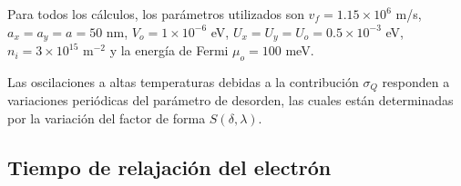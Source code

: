 \begin{frame}
  Para todos los cálculos, los parámetros utilizados son $v_{f}=1.15\times 10^{6}$ m/s, $a_{x}=a_{y}=a=50$ nm,
  $V_{o}=1\times10^{-6}$ eV, $U_{x}=U_{y}=U_{o}=0.5\times10^{-3}$ eV, $n_{i}=3\times10^{15}$ m$^{-2}$
  y la energía de Fermi $\mu_{o}=100$ meV.\\

  \vspace{0.5cm}

  Las oscilaciones a altas temperaturas debidas a la contribución $\sigma_{Q} $ responden a variaciones periódicas
  del parámetro de desorden, las cuales están determinadas por la variación del factor de forma $ S(\delta,\lambda)$.
\end{frame}

\subsection{Tiempo de relajación del electrón}

\begin{frame}
\end{frame}

\begin{frame}
\end{frame}

\begin{frame}
\end{frame}

\begin{frame}
\end{frame}

\begin{frame}
\end{frame}
